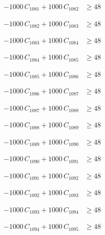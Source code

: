 \documentclass[a4paper,11pt]{article}
\begin{document}
\begin{align}
-1000\,C_{1081} + 1000\,C_{1082} &\geq 48 \nonumber
\end{align}

\begin{align}
-1000\,C_{1082} + 1000\,C_{1083} &\geq 48 \nonumber
\end{align}

\begin{align}
-1000\,C_{1083} + 1000\,C_{1084} &\geq 48 \nonumber
\end{align}

\begin{align}
-1000\,C_{1084} + 1000\,C_{1085} &\geq 48 \nonumber
\end{align}

\begin{align}
-1000\,C_{1085} + 1000\,C_{1086} &\geq 48 \nonumber
\end{align}

\begin{align}
-1000\,C_{1086} + 1000\,C_{1087} &\geq 48 \nonumber
\end{align}

\begin{align}
-1000\,C_{1087} + 1000\,C_{1088} &\geq 48 \nonumber
\end{align}

\begin{align}
-1000\,C_{1088} + 1000\,C_{1089} &\geq 48 \nonumber
\end{align}

\begin{align}
-1000\,C_{1089} + 1000\,C_{1090} &\geq 48 \nonumber
\end{align}

\begin{align}
-1000\,C_{1090} + 1000\,C_{1091} &\geq 48 \nonumber
\end{align}

\begin{align}
-1000\,C_{1091} + 1000\,C_{1092} &\geq 48 \nonumber
\end{align}

\begin{align}
-1000\,C_{1092} + 1000\,C_{1093} &\geq 48 \nonumber
\end{align}

\begin{align}
-1000\,C_{1093} + 1000\,C_{1094} &\geq 48 \nonumber
\end{align}

\begin{align}
-1000\,C_{1094} + 1000\,C_{1095} &\geq 48 \nonumber
\end{align}
\end{document}
